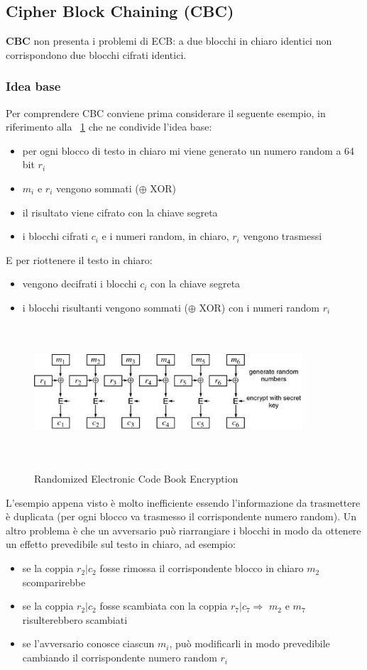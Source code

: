 \subsection{Cipher Block Chaining (CBC)}
\textbf{CBC} non presenta i problemi di ECB: a due blocchi in chiaro identici non corrispondono
due blocchi cifrati identici.
\subsubsection{Idea base}
Per comprendere CBC conviene prima considerare il seguente esempio, in riferimento alla \figurename ~\ref{fig:rand_ele_cb_enc} che ne condivide l'idea base:
\begin{itemize}
\item per ogni blocco di testo in chiaro mi viene generato un numero random a 64 bit $r_{i}$
\item $m_{i}$ e $r_{i}$ vengono sommati ($\oplus$ XOR)
\item il risultato viene cifrato con la chiave segreta
\item i blocchi cifrati $c_{i}$ e i numeri random, in chiaro, $r_{i}$ vengono trasmessi
\end{itemize}
E per riottenere il testo in chiaro:
\begin{itemize}
\item vengono decifrati i blocchi $c_{i}$ con la chiave segreta 
\item i blocchi risultanti vengono sommati ($\oplus$ XOR) con i numeri random $r_{i}$
\end{itemize}
\begin{figure}
\centering%
	\subfigure%
	{\includegraphics[height=5cm, width=10cm, keepaspectratio]{Immagini/modalita_operative/rand_ele_cb_enc.png}}
	\caption{Randomized Electronic Code Book Encryption\label{fig:rand_ele_cb_enc}} 	
\end{figure}
L'esempio appena visto è molto inefficiente essendo l'informazione da trasmettere è duplicata (per ogni blocco va trasmesso il corrispondente numero random). \newline
Un altro problema è che un avversario può riarrangiare i blocchi in modo da ottenere un effetto prevedibile sul testo in chiaro, ad esempio:
\begin{itemize}
\item se la coppia $r_{2}|c_{2}$ fosse rimossa il corrispondente blocco in chiaro $m_{2}$ scomparirebbe 
\item se la coppia $r_{2}|c_{2}$ fosse scambiata con la coppia $r_{7}|c_{7} \Rightarrow$ $m_{2}$ e $m_{7}$ risulterebbero scambiati
\item se l’avversario conosce ciascun  $m_{i}$, può modificarli in modo prevedibile cambiando il corrispondente numero random $r_{i}$
\end{itemize}
